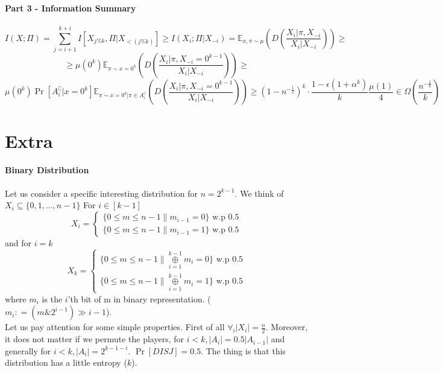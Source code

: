 \documentclass{article}
\theoremstyle{plain}
\begin{document}
\paragraph{Part 3 - Information Summary}
\begin{equation*}
    I(X;\Pi) = \overset{k+i}{\underset{j=i+1}{\sum } } I[X_{j \% k}, \Pi | X_{<(j \% k)}] \geq I(X_i;\Pi | X_{-i}) = \mathbb{E}_{x, \pi \sim \mu} \left( D\left(\frac{X_i | \pi, X_{-i}}{X_i | X_{-i}} \right) \right) \geq
\end{equation*}
\begin{equation*}
    \geq \mu(0^k) \mathbb{E}_{\pi \sim x = 0^k} \left( D\left(\frac{X_i | \pi, X_{-i} = 0^{k-1}}{X_i | X_{-i}} \right) \right) \geq 
\end{equation*}
\begin{equation*}
\mu(0^k) \Pr[A_{i}^\complement| x = 0^k] \mathbb{E}_{\pi \sim x = 0^k| \pi \in A_{i}^\complement} \left( D\left(\frac{X_i | \pi, X_{-i} = 0^{k-1}}{X_i | X_{-i}} \right) \right) \geq \left (1 - n^{-\frac{1}{k}} \right)^{k} \cdot \frac{1 - \epsilon (1 + \alpha ^k)}{k} \frac{\mu(1)}{4} \in \Omega\left(\frac{n^{-\frac{1}{k}}}{k}\right)
\end{equation*}
\section{Extra}
\paragraph{Binary Distribution}
Let us consider a specific interesting distribution for $n = 2^{k-1}$. We think of $X_i \subseteq \{0, 1, ... , n-1\} $ \newline
For $i \in [k-1]$
  \[
    X_i=\left\{
                \begin{array}{ll}
                  \{0 \leq m \leq n-1 \| m_{i-1} = 0\} \text{ w.p 0.5} \\
                  \{0 \leq m \leq n-1 \| m_{i-1} = 1\} \text{ w.p 0.5}
                \end{array}
              \right.
  \]
and for $i = k$
  \[
    X_k=\left\{
                \begin{array}{ll}
                  \{0 \leq m \leq n-1 \| \underset{i=1}{\overset{k-1}{\oplus}} m_i = 0\} \text{ w.p 0.5} \\
                  \{0 \leq m \leq n-1 \| \underset{i=1}{\overset{k-1}{\oplus}} m_i = 1\} \text{ w.p 0.5}
                \end{array}
              \right.
  \]
where $m_i$ is the $i$'th bit of m in binary representation. ($m_i \mathrel{\mathop:}= ( m \mathop{\&} 2^{i-1} ) \gg i-1 $). \\
Let us pay attention for some simple properties. First of all $\forall_i |X_i| = \frac{n}{2}$. Moreover, it does not matter if we permute the players, for $i < k, |A_i| = 0.5|A_{i-1}|$ and generally for $i < k, |A_i| = 2^{k-1-i}$. $\Pr[DISJ] = 0.5$. The thing is that this distribution has a little entropy ($k$).
\end{document}
